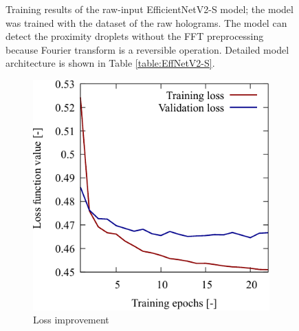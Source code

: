 \begin{figure}[H]
    \caption{Training results of the raw-input EfficientNetV2-S model; the model was trained with the dataset of the raw holograms. The model can detect the proximity droplets without the FFT preprocessing because Fourier transform is a reversible operation. Detailed model architecture is shown in Table \ref{table:EffNetV2-S}.} 
    \label{fig:rawmodelS}
\end{figure}

\begin{figure}[H]
    \centering
    \begin{subfigure}[t]{0.45\linewidth}
        \includegraphics[width=\linewidth]{./Figure/4_Results/training/lossXL.pdf}
        \caption{Loss improvement}
        \label{fig:rawmodelXL:loss}
    \end{subfigure}
    \hfill
    \begin{subfigure}[t]{0.45\linewidth}

\end{subfigure}
\end{figure}
